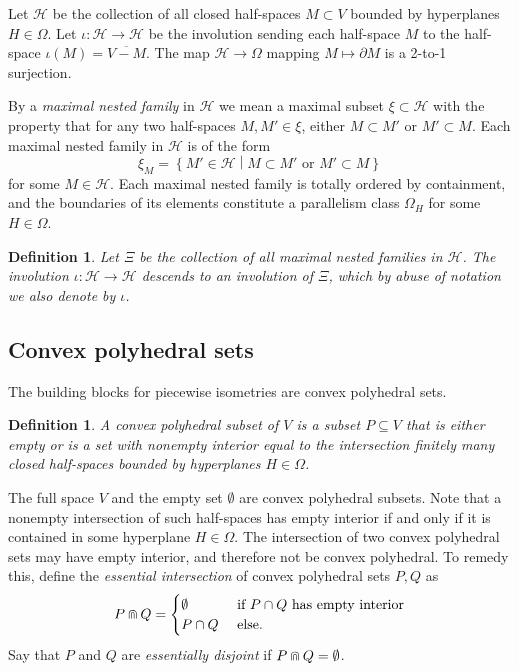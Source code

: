 \documentclass[11pt]{amsart}
\newtheorem{definition}[theorem]{Definition}
\numberwithin{table}{section}
\numberwithin{figure}{section}
\theoremstyle{remark}
\providecommand{\set}[1]{\left\lbrace#1\right\rbrace}
\newcommand\suchthat{ \mathrel{}\middle| \mathrel{}}
\begin{document}
Let $\mathcal{H}$ be the collection of all closed half-spaces
$M \subset V$ bounded by hyperplanes $H\in \Omega$. Let
$\iota:\mathcal{H} \to \mathcal{H}$ be the involution sending each
half-space $M$ to the half-space $\iota(M) = \overline{V-M}$. The map
$\mathcal{H}\to \Omega$ mapping $M\mapsto \partial M$ is a 2-to-1
surjection.

By a {\em maximal nested family} in $\mathcal{H}$ we mean a maximal
subset $\xi \subset \mathcal{H}$ with the property that for any two
half-spaces $M,M'\in \xi$, either $M\subset M'$ or $M'\subset
M$. Each maximal nested family in $\mathcal{H}$ is of the form
\[
  \xi_M = \set{ M'\in \mathcal{H} \suchthat M\subset M' \text{ or
    }M'\subset M}
\]
for some $M\in \mathcal{H}$. Each maximal nested family is totally
ordered by containment, and the boundaries of its elements constitute
a parallelism class $\Omega_H$ for some $H\in \Omega$.

\begin{definition} \label{def:phi}
Let $\Xi$ be the collection of all maximal nested families in
$\mathcal{H}$. The involution $\iota: \mathcal{H} \to \mathcal{H}$
descends to an involution of $\Xi$, which by abuse of notation we
also denote by $\iota$.
\end{definition}


\subsection{Convex polyhedral sets}

The building blocks for piecewise isometries are convex polyhedral
sets. 

\begin{definition}
  A {\em convex polyhedral subset} of $V$ is a subset $P\subseteq V$
  that is either empty or is a set with nonempty interior equal to the
  intersection finitely many closed half-spaces bounded by hyperplanes
  $H\in \Omega$.
\end{definition}


The full space $V$ and the empty set $\emptyset$ are convex polyhedral
subsets. Note that a nonempty intersection of such half-spaces has
empty interior if and only if it is contained in some hyperplane
$H\in \Omega$. The intersection of two convex polyhedral sets may have
empty interior, and therefore not be convex polyhedral. To remedy
this, define the {\em essential intersection} of convex polyhedral
sets $P,Q$ as
\[
  P \doublecap  Q = \begin{cases} \emptyset & \text{ if $P\cap Q$ has
      empty interior}\\
    P\cap Q & \text{ else.} \end{cases}
\]
Say that $P$ and $Q$ are {\em essentially disjoint} if $P\doublecap Q
= \emptyset$.
\end{document}
